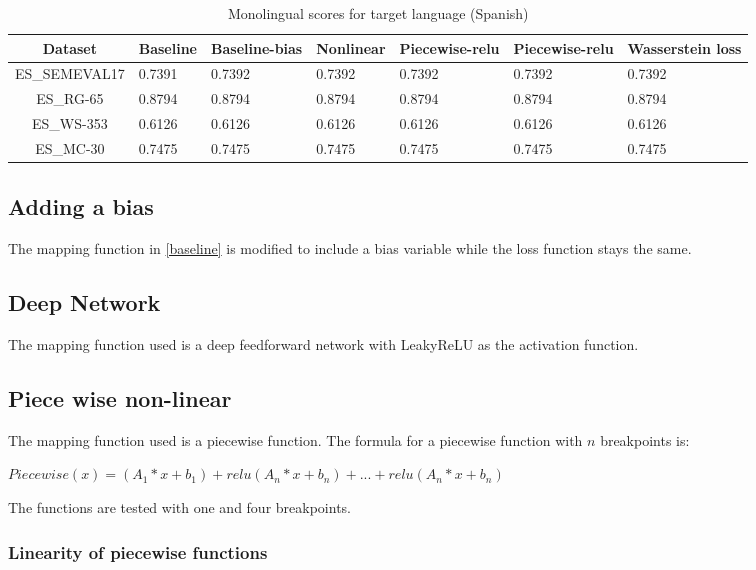 \documentclass[11pt]{article}
\begin{document}
\begin{table*}[ht]
  \begin{center}
  \begin{tabular}{|c|l|l|l|l|l|l|}
  \hline
  Dataset & Baseline & Baseline-bias & Nonlinear & Piecewise-relu & Piecewise-relu & Wasserstein loss\\
  \hline
  ES\_SEMEVAL17 & 0.7391 & 0.7392 & 0.7392 & 0.7392 & 0.7392 & 0.7392 \\
  \hline
  ES\_RG-65 & 0.8794 & 0.8794 & 0.8794 & 0.8794 & 0.8794 & 0.8794 \\
  \hline
  ES\_WS-353 & 0.6126 & 0.6126 & 0.6126 & 0.6126 & 0.6126 & 0.6126 \\
  \hline
  ES\_MC-30 & 0.7475 & 0.7475 & 0.7475 & 0.7475 & 0.7475 & 0.7475 \\
  \hline
  \end{tabular}
  \end{center}
  \caption{ Monolingual scores for target language (Spanish)}
  \label{monolingual-target}
\end{table*}

\subsection{Adding a bias}
The mapping function in \ref{baseline} is modified to include a bias variable while the loss function stays the same.

\subsection{Deep Network}
The mapping function used is a deep feedforward network with LeakyReLU as the activation function.

\subsection{Piece wise non-linear}
The mapping function used is a piecewise function. The formula for a piecewise function with $n$ breakpoints is:

$Piecewise(x) = (A_1*x + b_1) + relu(A_n*x + b_n) + ... + relu(A_n*x + b_n)$

The functions are tested with one and four breakpoints.

\subsubsection{Linearity of piecewise functions}
\end{document}
